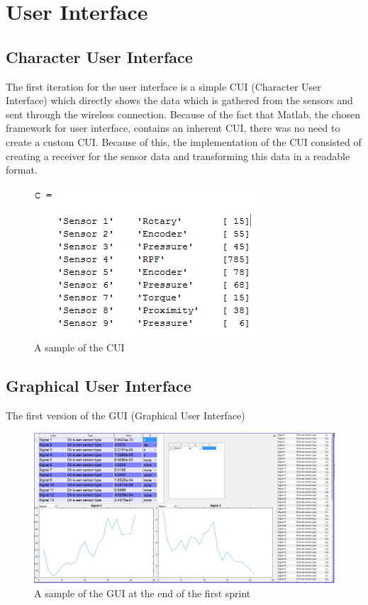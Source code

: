\section{User Interface}
\subsection{Character User Interface}
The first iteration for the user interface is a simple CUI (Character User Interface) which directly shows the data which is gathered from the sensors and sent through the wireless connection. Because of the fact that Matlab, the chosen framework for user interface, contains an inherent CUI, there was no need to create a custom CUI. Because of this, the implementation of the CUI consisted of creating a receiver for the sensor data and transforming this data in a readable format. 

\begin{figure}[H]
	\centering
	\includegraphics[width=.75\textwidth]{images/CUI}
	\caption{A sample of the CUI} 
	\label{fig:CUIV1}
\end{figure} 

\subsection{Graphical User Interface}
The first version of the GUI (Graphical User Interface) 
\begin{figure}[H]
	\centering
	\includegraphics[width=.75\textwidth]{images/GUIV1}
	\caption{A sample of the GUI at the end of the first sprint} 
	\label{fig:GUIV1}
\end{figure} 